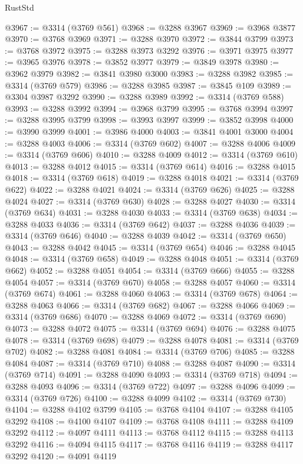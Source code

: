 \begin{lexlean}{RustStd}
\begin{coremodule}
@3967 := @3314 (@3769 @561)
@3968 := @3288 @3967
@3969 := @3968 @3877
@3970 := @3768 @3969
@3971 := @3288 @3970
@3972 := @3844 @3799
@3973 := @3768 @3972
@3975 := @3288 @3973 @3292
@3976 := @3971 @3975
@3977 := @3965 @3976
@3978 := @3852 @3977
@3979 := @3849 @3978
@3980 := @3962 @3979
@3982 := @3841 @3980 @3000
@3983 := @3288 @3982
@3985 := @3314 (@3769 @579)
@3986 := @3288 @3985
@3987 := @3845 @109
@3989 := @3304 @3987 @3292
@3990 := @3288 @3989
@3992 := @3314 (@3769 @588)
@3993 := @3288 @3992
@3994 := @3968 @3799
@3995 := @3768 @3994
@3997 := @3288 @3995 @3799
@3998 := @3993 @3997
@3999 := @3852 @3998
@4000 := @3990 @3999
@4001 := @3986 @4000
@4003 := @3841 @4001 @3000
@4004 := @3288 @4003
@4006 := @3314 (@3769 @602)
@4007 := @3288 @4006
@4009 := @3314 (@3769 @606)
@4010 := @3288 @4009
@4012 := @3314 (@3769 @610)
@4013 := @3288 @4012
@4015 := @3314 (@3769 @614)
@4016 := @3288 @4015
@4018 := @3314 (@3769 @618)
@4019 := @3288 @4018
@4021 := @3314 (@3769 @622)
@4022 := @3288 @4021
@4024 := @3314 (@3769 @626)
@4025 := @3288 @4024
@4027 := @3314 (@3769 @630)
@4028 := @3288 @4027
@4030 := @3314 (@3769 @634)
@4031 := @3288 @4030
@4033 := @3314 (@3769 @638)
@4034 := @3288 @4033
@4036 := @3314 (@3769 @642)
@4037 := @3288 @4036
@4039 := @3314 (@3769 @646)
@4040 := @3288 @4039
@4042 := @3314 (@3769 @650)
@4043 := @3288 @4042
@4045 := @3314 (@3769 @654)
@4046 := @3288 @4045
@4048 := @3314 (@3769 @658)
@4049 := @3288 @4048
@4051 := @3314 (@3769 @662)
@4052 := @3288 @4051
@4054 := @3314 (@3769 @666)
@4055 := @3288 @4054
@4057 := @3314 (@3769 @670)
@4058 := @3288 @4057
@4060 := @3314 (@3769 @674)
@4061 := @3288 @4060
@4063 := @3314 (@3769 @678)
@4064 := @3288 @4063
@4066 := @3314 (@3769 @682)
@4067 := @3288 @4066
@4069 := @3314 (@3769 @686)
@4070 := @3288 @4069
@4072 := @3314 (@3769 @690)
@4073 := @3288 @4072
@4075 := @3314 (@3769 @694)
@4076 := @3288 @4075
@4078 := @3314 (@3769 @698)
@4079 := @3288 @4078
@4081 := @3314 (@3769 @702)
@4082 := @3288 @4081
@4084 := @3314 (@3769 @706)
@4085 := @3288 @4084
@4087 := @3314 (@3769 @710)
@4088 := @3288 @4087
@4090 := @3314 (@3769 @714)
@4091 := @3288 @4090
@4093 := @3314 (@3769 @718)
@4094 := @3288 @4093
@4096 := @3314 (@3769 @722)
@4097 := @3288 @4096
@4099 := @3314 (@3769 @726)
@4100 := @3288 @4099
@4102 := @3314 (@3769 @730)
@4104 := @3288 @4102 @3799
@4105 := @3768 @4104
@4107 := @3288 @4105 @3292
@4108 := @4100 @4107
@4109 := @3768 @4108
@4111 := @3288 @4109 @3292
@4112 := @4097 @4111
@4113 := @3768 @4112
@4115 := @3288 @4113 @3292
@4116 := @4094 @4115
@4117 := @3768 @4116
@4119 := @3288 @4117 @3292
@4120 := @4091 @4119

\end{coremodule}
\end{lexlean}
